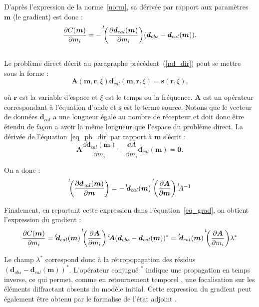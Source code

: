 D'après l'expression de la norme~\ref{norm}, sa dérivée par rapport aux paramètres $\bm{m}$ (le gradient) est donc : 
\begin{equation}
	 \frac{\dd C (\bm{m})}{\dd m_{i}} = -\tr{\left( \frac{\dd \bm{d}_{cal}(\bm{m}) }{\dd m_{i}} \right)} ( \bm{d}_{obs} - \bm{d}_{cal}(\bm{m})) \text{.}
	 \label{eq_grad}
\end{equation}\\



Le problème direct décrit au paragraphe précédent~(\ref{pd_dir}) peut se mettre sous la forme :
\begin{equation}
	\bm{A}(\bm{m},\bm{r},\xi)\bm{d}_{cal}(\bm{m},\bm{r},\xi)=\bm{s}(\bm{r},\xi)\text{,}
	\label{eq_pb_dir}
\end{equation}

où $\bm{r}$ est la variable d'espace et $\xi$ est le temps ou la fréquence. $\bm{A}$ est un opérateur correspondant à l'équation d'onde et $\bm{s}$ est le terme source. Notons que le vecteur de données $\bm{d}_{cal}$ a une longueur égale au nombre de récepteur et doit donc être étendu de façon a avoir la même longueur que l'espace du problème direct. La dérivée de l'équation~\ref{eq_pb_dir} par rapport à $\bm{m}$ s'écrit : 
\begin{equation}
	\bm{A} \frac{\dd \bm{d}_{cal}(\bm{m})}{\dd m_{i}} + \frac{\dd A}{\dd m_{i}}\bm{d}_{cal}(\bm{m}) = \bm{0} \text{.}
\end{equation}

On a donc : 
\begin{equation}
	\tr{\left( \frac{\dd \bm{d}_{cal}(\bm{m})}{\dd \bm{m}}  \right)} = - \tr{\bm{d}_{cal}(\bm{m})} \tr{\left( \frac{\dd \bm{A}}{\dd \bm{m}} \right)} \tr{A^{-1}}
	\label{sub}
\end{equation} 	

Finalement, en reportant cette expression dans l'équation~\ref{eq_grad}, on obtient l'expression du gradient : 
\begin{equation}
	 \frac{\dd C (\bm{m})}{\dd m_{i}} = \tr{\bm{d}_{cal}(\bm{m})}  \tr{\left( \frac{\dd \bm{A}}{\dd m_{i}}\right)} \tr{\bm{A}} (\bm{d}_{obs} - \bm{d}_{cal}(\bm{m}))^* = \tr{\bm{d}_{cal}(\bm{m})} \tr{\left( \frac{\dd \bm{A}}{\dd m_{i}}\right)} \lambda^*
\end{equation}

Le champ $\lambda^*$ correspond donc à la rétropopagation des résidus $( \bm{d}_{obs} - \bm{d}_{cal}(\bm{m}))^*$. L'opérateur conjugué $^*$ indique une propagation en temps inverse, ce qui permet, comme en retournement temporel \citep{prada_2002}, une focalisation sur les éléments diffractant absents du modèle initial. Cette expression du gradient peut également être obtenu par le formalise de l'état adjoint \citep{plessix}.\\

